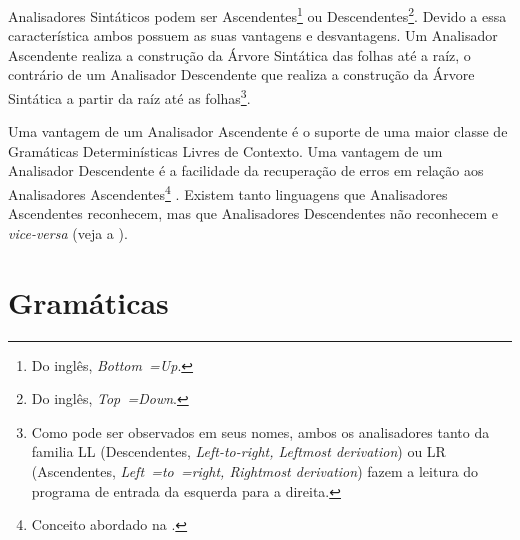 Analisadores Sintáticos podem ser Ascendentes\footnote{
Do inglês, \textit{Bottom~=Up}.
}
ou Descendentes\footnote{
Do inglês, \textit{Top~=Down}.
}.
Devido a essa característica ambos possuem as suas vantagens e
desvantagens.
Um Analisador Ascendente realiza a construção da Árvore Sintática das folhas até a raíz,
o contrário de um Analisador Descendente que realiza a construção da Árvore Sintática a partir da raíz até as folhas\footnote{
Como pode ser observados em seus nomes,
ambos os analisadores tanto da familia LL (Descendentes,
\textit{Left-to-right, Leftmost derivation}) ou LR (Ascendentes, \textit{Left~=to~=right,
Rightmost derivation}) fazem a leitura do programa de entrada da esquerda para a direita.
}.

Uma vantagem de um Analisador Ascendente é o suporte de uma maior classe de Gramáticas Determinísticas Livres de Contexto.
Uma vantagem de um Analisador Descendente é a facilidade da recuperação de erros em relação aos Analisadores Ascendentes\footnote{
Conceito abordado na
.
}
\cite{sippu1982,lr1ErrorRecovery,errorRecoveryForYaccParsers,repairingSyntaxErrorsInLR,larkJosefGrosch,errorsInLRParsers}.
Existem tanto linguagens que Analisadores Ascendentes reconhecem,
mas que Analisadores Descendentes não reconhecem e
\textit{vice-versa} (veja a ).


\section{Gramáticas}
\label{section:introducaoGramaticas}

